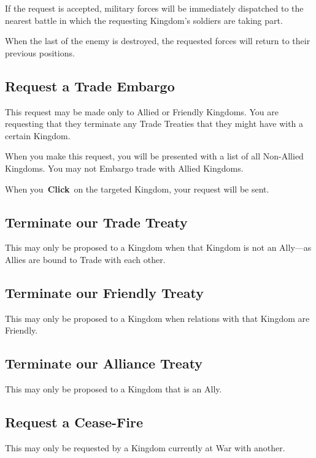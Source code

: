If the request is accepted, military forces will be immediately dispatched to the nearest battle in which the requesting Kingdom’s soldiers are taking part.

When the last of the enemy is destroyed, the requested forces will return to their previous positions.

\subsection{Request a Trade Embargo}

This request may be made only to Allied or Friendly Kingdoms. You are requesting that they terminate any Trade Treaties that they might have with a certain Kingdom.

When you make this request, you will be presented with a list of all Non-Allied Kingdoms. You may not Embargo trade with Allied Kingdoms.

When you \textbf{Click} on the targeted Kingdom, your request will be sent.

\subsection{Terminate our Trade Treaty}

This may only be proposed to a Kingdom when that Kingdom is not an Ally---as Allies are bound to Trade with each other.

\subsection{Terminate our Friendly Treaty}

This may only be proposed to a Kingdom when relations with that Kingdom are Friendly.

\subsection{Terminate our Alliance Treaty}


This may only be proposed to a Kingdom that is an Ally.

\subsection{Request a Cease-Fire}

This may only be requested by a Kingdom currently at War with another.

